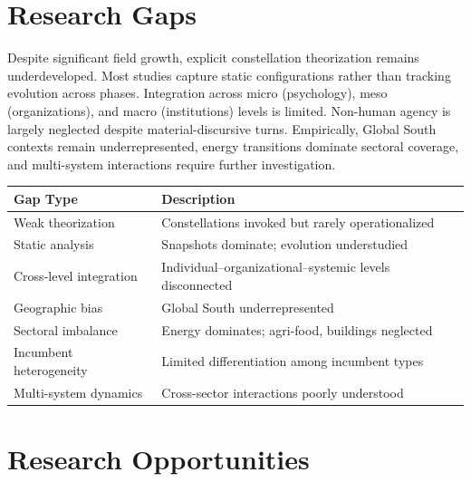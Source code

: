 \documentclass[
    fontsize=10pt,
    twoside=true,
    secnumdepth=2,
    numbers=noenddot
]{kaobook}
\begin{document}
\section{Research Gaps}

Despite significant field growth, explicit constellation theorization remains underdeveloped. Most studies capture static configurations rather than tracking evolution across phases. Integration across micro (psychology), meso (organizations), and macro (institutions) levels is limited. Non-human agency is largely neglected despite material-discursive turns. Empirically, Global South contexts remain underrepresented, energy transitions dominate sectoral coverage, and multi-system interactions require further investigation.

\tablestriped
\small
\begin{center}
\begin{tabular}{@{}p{2.8cm}p{7cm}@{}}
\toprule
\textbf{Gap Type} & \textbf{Description} \\
\midrule
Weak theorization & Constellations invoked but rarely operationalized \\
Static analysis & Snapshots dominate; evolution understudied \\
Cross-level integration & Individual--organizational--systemic levels disconnected \\
Geographic bias & Global South underrepresented \\
Sectoral imbalance & Energy dominates; agri-food, buildings neglected \\
Incumbent heterogeneity & Limited differentiation among incumbent types \\
Multi-system dynamics & Cross-sector interactions poorly understood \\
\bottomrule
\end{tabular}
\label{tab:gaps}
\end{center}
\normalsize

\section{Research Opportunities}
\end{document}
